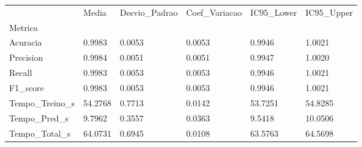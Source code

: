 \begin{tabular}{llllll}
\toprule
 & Media & Desvio_Padrao & Coef_Variacao & IC95_Lower & IC95_Upper \\
Metrica &  &  &  &  &  \\
\midrule
Acuracia & 0.9983 & 0.0053 & 0.0053 & 0.9946 & 1.0021 \\
Precision & 0.9984 & 0.0051 & 0.0051 & 0.9947 & 1.0020 \\
Recall & 0.9983 & 0.0053 & 0.0053 & 0.9946 & 1.0021 \\
F1_score & 0.9983 & 0.0053 & 0.0053 & 0.9946 & 1.0021 \\
Tempo_Treino_s & 54.2768 & 0.7713 & 0.0142 & 53.7251 & 54.8285 \\
Tempo_Pred_s & 9.7962 & 0.3557 & 0.0363 & 9.5418 & 10.0506 \\
Tempo_Total_s & 64.0731 & 0.6945 & 0.0108 & 63.5763 & 64.5698 \\
\bottomrule
\end{tabular}
